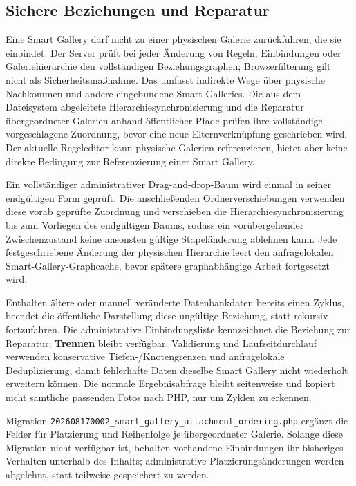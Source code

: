 \documentclass[11pt,a4paper]{article}
\newcommand{\ui}[1]{\textbf{#1}}
\begin{document}
\subsection{Sichere Beziehungen und Reparatur}

Eine Smart Gallery darf nicht zu einer physischen Galerie zurückführen, die sie
einbindet. Der Server prüft bei jeder Änderung von Regeln, Einbindungen oder
Galeriehierarchie den vollständigen Beziehungsgraphen; Browserfilterung gilt
nicht als Sicherheitsmaßnahme. Das umfasst indirekte Wege über physische
Nachkommen und andere eingebundene Smart Galleries. Die aus dem Dateisystem
abgeleitete Hierarchiesynchronisierung und die Reparatur übergeordneter Galerien
anhand öffentlicher Pfade prüfen ihre vollständige vorgeschlagene Zuordnung,
bevor eine neue Elternverknüpfung geschrieben wird. Der aktuelle Regeleditor
kann physische Galerien referenzieren, bietet aber keine direkte Bedingung zur
Referenzierung einer Smart Gallery.

Ein vollständiger administrativer Drag-and-drop-Baum wird einmal in seiner
endgültigen Form geprüft. Die anschließenden Ordnerverschiebungen verwenden
diese vorab geprüfte Zuordnung und verschieben die Hierarchiesynchronisierung
bis zum Vorliegen des endgültigen Baums, sodass ein vorübergehender
Zwischenzustand keine ansonsten gültige Stapeländerung ablehnen kann. Jede
festgeschriebene Änderung der physischen Hierarchie leert den anfragelokalen
Smart-Gallery-Graphcache, bevor spätere graphabhängige Arbeit fortgesetzt wird.

Enthalten ältere oder manuell veränderte Datenbankdaten bereits einen Zyklus,
beendet die öffentliche Darstellung diese ungültige Beziehung, statt rekursiv
fortzufahren. Die administrative Einbindungsliste kennzeichnet die Beziehung zur
Reparatur; \ui{Trennen} bleibt verfügbar. Validierung und Laufzeitdurchlauf
verwenden konservative Tiefen-/Knotengrenzen und anfragelokale Deduplizierung,
damit fehlerhafte Daten dieselbe Smart Gallery nicht wiederholt erweitern
können. Die normale Ergebnisabfrage bleibt seitenweise und kopiert nicht
sämtliche passenden Fotos nach PHP, nur um Zyklen zu erkennen.

Migration \texttt{202608170002\_smart\_gallery\_attachment\_ordering.php}
ergänzt die Felder für Platzierung und Reihenfolge je übergeordneter Galerie.
Solange diese Migration nicht verfügbar ist, behalten vorhandene Einbindungen
ihr bisheriges Verhalten unterhalb des Inhalts; administrative
Platzierungsänderungen werden abgelehnt, statt teilweise gespeichert zu werden.
\end{document}
